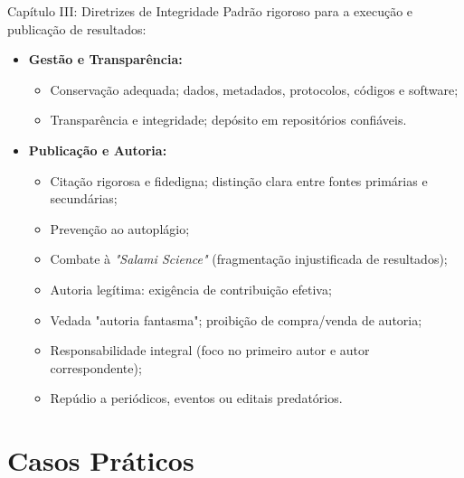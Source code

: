 \documentclass[aspectratio=169]{beamer}
\begin{document}
\begin{frame}[t]{Capítulo III: Diretrizes de Integridade}
    \footnotesize
    Padrão rigoroso para a execução e publicação de resultados:
    
    \vspace{0.3cm}
    \begin{itemize}
        \item \textbf{Gestão e Transparência:}
        \begin{itemize}
            \item Conservação adequada; dados, metadados, protocolos, códigos e software;
            \item Transparência e integridade; depósito em repositórios confiáveis.
        \end{itemize}
        
        \vspace{0.2cm}
        
        \item \textbf{Publicação e Autoria:}
        \begin{itemize}
            \item Citação rigorosa e fidedigna; distinção clara entre fontes primárias e secundárias;
            \item Prevenção ao autoplágio;
            \item Combate à \textit{"Salami Science"} (fragmentação injustificada de resultados);
            \item Autoria legítima: exigência de contribuição efetiva;
            \item Vedada "autoria fantasma"; proibição de compra/venda de autoria;
            \item Responsabilidade integral (foco no primeiro autor e autor correspondente);
            \item Repúdio a periódicos, eventos ou editais predatórios.
        \end{itemize}
    \end{itemize}
\end{frame}

\section{Casos Práticos}
\end{document}

